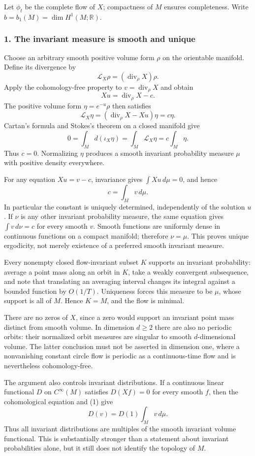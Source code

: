 \documentclass[11pt]{article}
\begin{document}
Let $\phi_t$ be the complete flow of $X$; compactness of $M$ ensures completeness. Write $b=b_1(M)=\dim H^1(M;\mathbb R)$.

\subsubsection{1. The invariant measure is smooth and unique}
Choose an arbitrary smooth positive volume form $\rho$ on the orientable manifold. Define its divergence by
\[
 \mathcal L_X\rho=(\operatorname{div}_\rho X)\rho.
\]
Apply the cohomology-free property to $v=\operatorname{div}_\rho X$ and obtain
\[
 Xu=\operatorname{div}_\rho X-c.
\]
The positive volume form $\eta=e^{-u}\rho$ then satisfies
\[
 \mathcal L_X\eta=(\operatorname{div}_\rho X-Xu)\eta=c\eta.
\]
Cartan's formula and Stokes's theorem on a closed manifold give
\[
 0=\int_M d(\iota_X\eta)=\int_M\mathcal L_X\eta
   =c\int_M\eta.
\]
Thus $c=0$. Normalizing $\eta$ produces a smooth invariant probability measure $\mu$ with positive density everywhere.

For any equation $Xu=v-c$, invariance gives $\int Xu\,d\mu=0$, and hence
\[
 c=\int_M v\,d\mu.                                      \tag{1}
\]
In particular the constant is uniquely determined, independently of the solution $u$. If $\nu$ is any other invariant probability measure, the same equation gives $\int v\,d\nu=c$ for every smooth $v$. Smooth functions are uniformly dense in continuous functions on a compact manifold; therefore $\nu=\mu$. This proves unique ergodicity, not merely existence of a preferred smooth invariant measure.

Every nonempty closed flow-invariant subset $K$ supports an invariant probability: average a point mass along an orbit in $K$, take a weakly convergent subsequence, and note that translating an averaging interval changes its integral against a bounded function by $O(1/T)$. Uniqueness forces this measure to be $\mu$, whose support is all of $M$. Hence $K=M$, and the flow is minimal.

There are no zeros of $X$, since a zero would support an invariant point mass distinct from smooth volume. In dimension $d\geq2$ there are also no periodic orbits: their normalized orbit measures are singular to smooth $d$-dimensional volume. The latter conclusion must not be asserted in dimension one, where a nonvanishing constant circle flow is periodic as a continuous-time flow and is nevertheless cohomology-free.

The argument also controls invariant distributions. If a continuous linear functional $D$ on $C^\infty(M)$ satisfies $D(Xf)=0$ for every smooth $f$, then the cohomological equation and (1) give
\[
 D(v)=D(1)\int_M v\,d\mu.                               \tag{2}
\]
Thus all invariant distributions are multiples of the smooth invariant volume functional. This is substantially stronger than a statement about invariant probabilities alone, but it still does not identify the topology of $M$.
\end{document}
